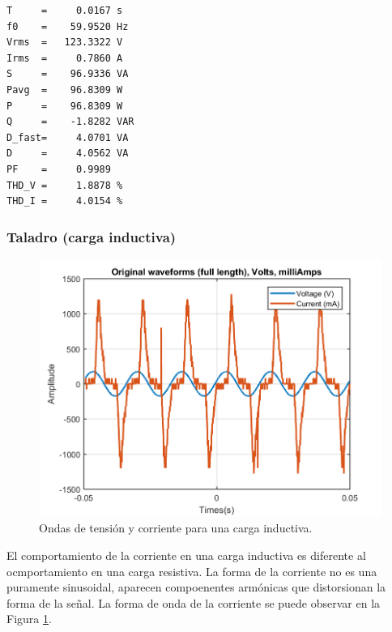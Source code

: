 \documentclass[journal]{IEEEtran}
\begin{document}
\begin{lstlisting}[caption = Carga resistiva.]
T     =     0.0167 s 
f0    =    59.9520 Hz 
Vrms  =   123.3322 V
Irms  =     0.7860 A
S     =    96.9336 VA
Pavg  =    96.8309 W 
P     =    96.8309 W 
Q     =    -1.8282 VAR 
D_fast=     4.0701 VA 
D     =     4.0562 VA 
PF    =     0.9989 
THD_V =     1.8878 %
THD_I =     4.0154 %
\end{lstlisting}

\subsubsection{Taladro (carga inductiva)}

\begin{figure}[h]
\centering
\includegraphics[clip,width=\columnwidth]
{original_waveform_drill.png}
\caption{Ondas de tensión y corriente para una carga
inductiva.}
\label{original_inductive_load}
\end{figure}

El comportamiento de la corriente en una carga inductiva 
es diferente al ocmportamiento en una carga resistiva. 
La forma de la corriente no es una puramente sinusoidal,
aparecen compoenentes armónicas que distorsionan la forma 
de la señal. La forma de onda de la corriente
se puede observar en la Figura 
\ref{original_inductive_load}.\\ 
\end{document}
